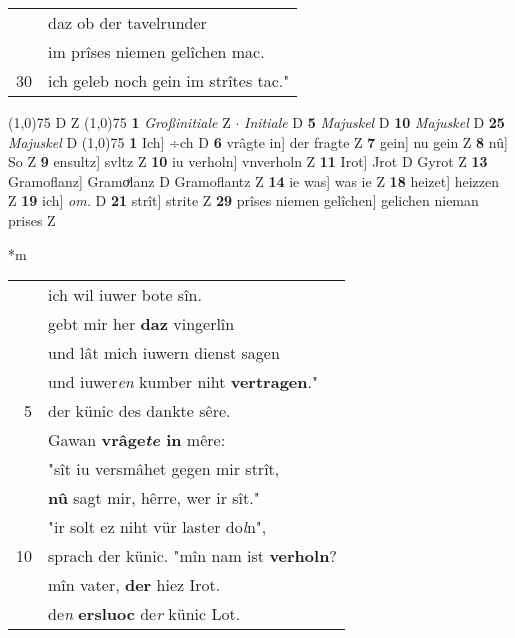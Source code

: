 \documentclass[8pt,a4paper,notitlepage]{article}
\begin{document}
\begin{table}[ht]
\begin{minipage}[t]{0.5\linewidth}
\begin{tabular}{rl}
 & daz ob der tavelrunder\\ 
 & im prîses niemen gelîchen mac.\\ 
30 & ich geleb noch gein im strîtes tac."\\ 
\end{tabular}
\scriptsize
\line(1,0){75} \newline
D Z \newline
\line(1,0){75} \newline
\textbf{1} \textit{Großinitiale} Z   $\cdot$ \textit{Initiale} D  \textbf{5} \textit{Majuskel} D  \textbf{10} \textit{Majuskel} D  \textbf{25} \textit{Majuskel} D  \newline
\line(1,0){75} \newline
\textbf{1} Ich] ÷ch D \textbf{6} vrâgte in] der fragte Z \textbf{7} gein] nu gein Z \textbf{8} nû] So Z \textbf{9} ensultz] svltz Z \textbf{10} iu verholn] vnverholn Z \textbf{11} Irot] Jrot D Gyrot Z \textbf{13} Gramoflanz] Gramoͮlanz D Gramoflantz Z \textbf{14} ie was] was ie Z \textbf{18} heizet] heizzen Z \textbf{19} ich] \textit{om.} D \textbf{21} strît] strite Z \textbf{29} prîses niemen gelîchen] gelichen nieman prises Z \newline
\end{minipage}
\hspace{0.5cm}
\begin{minipage}[t]{0.5\linewidth}
\small
\begin{center}*m
\end{center}
\begin{tabular}{rl}
 & ich wil iuwer bote sîn.\\ 
 & gebt mir her \textbf{daz} vingerlîn\\ 
 & und lât mich iuwern dienst sagen\\ 
 & und iuwer\textit{en} kumber niht \textbf{vertragen}."\\ 
5 & der künic des dankte sêre.\\ 
 & Gawan \textbf{vrâge\textit{te} in} mêre:\\ 
 & "sît iu versmâhet gegen mir strît,\\ 
 & \textbf{nû} sagt mir, hêrre, wer ir sît."\\ 
 & "ir solt ez niht vür laster do\textit{l}n",\\ 
10 & sprach der künic. "mîn nam ist \textbf{verholn}?\\ 
 & mîn vater, \textbf{der} hiez Irot.\\ 
 & de\textit{n} \textbf{ersluoc} de\textit{r} künic Lot.\\ 

\end{tabular}
\end{minipage}
\end{table}
\end{document}
